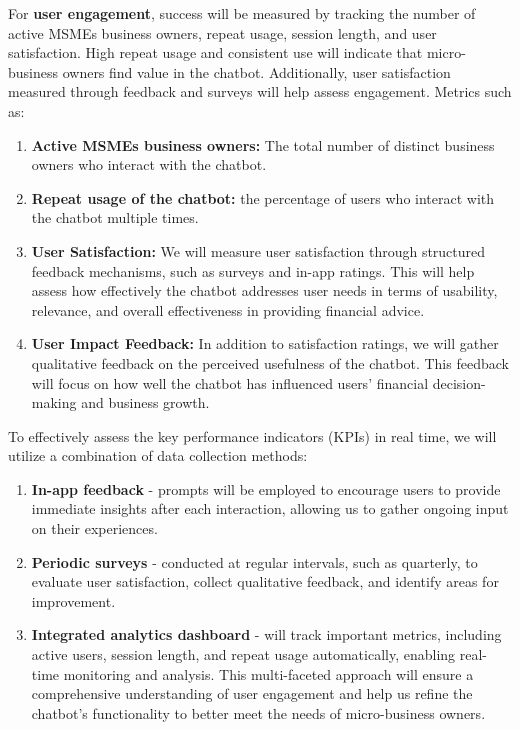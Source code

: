 \documentclass{article}
\begin{document}
For \textbf{user engagement}, success will be measured by tracking the number of active MSMEs business owners, repeat usage, session length, and user satisfaction. High repeat usage and consistent use will indicate that micro-business owners find value in the chatbot. Additionally, user satisfaction measured through feedback and surveys will help assess engagement. Metrics such as:
\begin{enumerate}[label=(\alph*)]
    
    \item \textbf{Active MSMEs business owners:} The total number of distinct business owners who interact with the chatbot.
    
    \item \textbf{Repeat usage of the chatbot:} the percentage of users who interact with the chatbot multiple times.
    
    \item \textbf{User Satisfaction:} We will measure user satisfaction through structured feedback mechanisms, such as surveys and in-app ratings. This will help assess how effectively the chatbot addresses user needs in terms of usability, relevance, and overall effectiveness in providing financial advice.
    
    \item \textbf{User Impact Feedback:} In addition to satisfaction ratings, we will gather qualitative feedback on the perceived usefulness of the chatbot. This feedback will focus on how well the chatbot has influenced users’ financial decision-making and business growth.
    
\end{enumerate}

To effectively assess the key performance indicators (KPIs) in real time, we will utilize a combination of data collection methods:

\begin{enumerate}[label=(\alph*)]
    \item \textbf{In-app feedback} - prompts will be employed to encourage users to provide immediate insights after each interaction, allowing us to gather ongoing input on their experiences.
    
    \item \textbf{Periodic surveys} - conducted at regular intervals, such as quarterly, to evaluate user satisfaction, collect qualitative feedback, and identify areas for improvement.
    
    \item \textbf{Integrated analytics dashboard} - will track important metrics, including active users, session length, and repeat usage automatically, enabling real-time monitoring and analysis. This multi-faceted approach will ensure a comprehensive understanding of user engagement and help us refine the chatbot’s functionality to better meet the needs of micro-business owners.
\end{enumerate}
\end{document}

